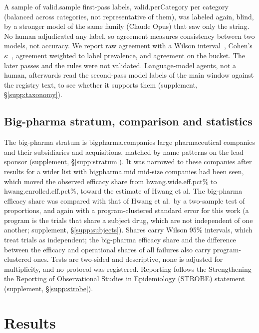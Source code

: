 \documentclass[preprint,11pt]{elsarticle}
\begin{document}
A sample of \num{valid.sample} first-pass labels, \num{valid.perCategory} per category (balanced across categories, not representative of them), was labeled again, blind, by a stronger model of the same family (Claude Opus) that saw only the string. No human adjudicated any label, so agreement measures consistency between two models, not accuracy. We report raw agreement with a Wilson interval~\cite{brown2001}, Cohen's $\kappa$~\cite{cohen1960}, agreement weighted to label prevalence, and agreement on the bucket. The later passes and the rules were not validated. Language-model agents, not a human, afterwards read the second-pass model labels of the main window against the registry text, to see whether it supports them (supplement, \S\ref{supp:taxonomy}).

\subsection{Big-pharma stratum, comparison and statistics}\label{sec:strata}
The big-pharma stratum is \num{bigpharma.companies} large pharmaceutical companies and their subsidiaries and acquisitions, matched by name patterns on the lead sponsor (supplement, \S\ref{supp:stratum}). It was narrowed to these companies after results for a wider list with \num{bigpharma.mid} mid-size companies had been seen, which moved the observed efficacy share from \num{hwang.wide.eff.pct}\% to \num{hwang.enrolled.eff.pct}\%, toward the estimate of Hwang et al. The big-pharma efficacy share was compared with that of Hwang et al.\ by a two-sample test of proportions, and again with a program-clustered standard error for this work (a program is the trials that share a subject drug, which are not independent of one another; supplement, \S\ref{supp:subjects}). Shares carry Wilson 95\% intervals, which treat trials as independent; the big-pharma efficacy share and the difference between the efficacy and operational shares of all failures also carry program-clustered ones. Tests are two-sided and descriptive, none is adjusted for multiplicity, and no protocol was registered. Reporting follows the Strengthening the Reporting of Observational Studies in Epidemiology (STROBE) statement~\cite{vonelm2007} (supplement, \S\ref{supp:strobe}).

\section{Results}
\end{document}
